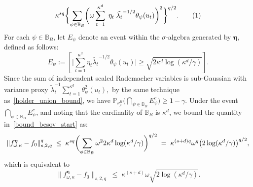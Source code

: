 \documentclass[twoside,11pt]{article}
\newcommand\numberthis{\addtocounter{equation}{1}\tag{\theequation}}
\newcommand{\mP}{\mathbb{P}} %
\newcommand{\dimDensity}{d} %
\newcommand{\smoothness}{s}
\newcommand{\ONset}{\mathbb{B}}
\newcommand{\maxErrorTypeOne}{\gamma} %
\newcommand{\binNum}{\kappa}           %
\newcommand{\coef}{\theta}
\newcommand{\besovParamMicroscope}{q}
\begin{document}
\begin{appendix}
\begin{itemize}
\begin{align*}
		\binNum^{\smoothness \besovParamMicroscope}
		\biggl\{
		\sum_{
			\psi
			\in 
			\ONset_{B}
		}
		\biggl(
		\omega
		\sum_{t=1}^{\binNum^{\dimDensity}}
		\; \eta_t \;\tilde{\lambda_t}^{-1/2}
		\coef_{\psi}(u_t)
		\biggr)^2
		\biggr\}^{\besovParamMicroscope/2}.
		\numberthis
		\label{bound_besov_start}
	\end{align*}
	For each \( \psi \in \ONset_{B} \), let \( E_{\psi} \) denote an event within the \( \sigma \)-algebra generated by \( \boldsymbol{\eta} \), defined as follows:
	\begin{equation*}
		E_{\psi}:= \left[ \big|  \sum_{t=1}^{\binNum^{\dimDensity}} \eta_t \tilde{\lambda_t}^{-1/2} \coef_{\psi}(u_t) \bigr|
		\geq
		\sqrt{2 \binNum^\dimDensity \log ( \binNum^\dimDensity / \maxErrorTypeOne )} \right].  
	\end{equation*}
	Since the sum of independent scaled Rademacher variables is sub-Gaussian with variance proxy
	$
	\tilde{\lambda}_t^{-1} \sum_{t=1}^{\binNum^\dimDensity} \coef_\psi^2(u_t),
	$
	by the same technique as~\eqref{holder_union_bound}, we have $\mP_{\nu_\rho^B}
	\bigl(
	\bigcap_{\psi \in \ONset_B} E_\psi^c
	\bigr) \geq 1-\gamma$.
	Under the event $\bigcap_{\psi \in \ONset_B} E_{\psi}^c$, and noting that the cardinality of $\ONset_B$ is $\binNum^\dimDensity$,
	we bound the quantity in~\eqref{bound_besov_start}  as:
	\begin{equation*}
		\|f^{{\boldsymbol{\eta}}}_{\omega, \binNum}
		-
		f_0\|^\besovParamMicroscope_{
			\smoothness,
			2,
			\besovParamMicroscope
		}
		\;
		\leq
		\;
		\binNum^{\smoothness \besovParamMicroscope}
		\biggl(
		\sum_{
			\phi
			\in 
			\ONset_{B}
		}
		\omega^2
		2 \binNum^\dimDensity
		\log(\binNum^\dimDensity/\maxErrorTypeOne)
		\biggr)^{\besovParamMicroscope/2}
		\\
		\;
		=
		\;
		\binNum^{(\smoothness + \dimDensity) \besovParamMicroscope}
		\omega^\besovParamMicroscope
		\bigl(
		2\log(\binNum^\dimDensity/\maxErrorTypeOne)
		\bigr)^{\besovParamMicroscope/2},
	\end{equation*}
	which is equivalent to
	\begin{equation*}
		\|f^{{\boldsymbol{\eta}}}_{\omega, \binNum}
		-
		f_0\|_{
			\smoothness,
			2,
			\besovParamMicroscope
		}
		\;
		\leq
		\;
		\binNum^{(\smoothness + \dimDensity)}
		\omega
		\sqrt{
			2\log(\binNum^\dimDensity/\maxErrorTypeOne)
		}.
	\end{equation*}

\end{itemize}
\end{appendix}
\end{document}
